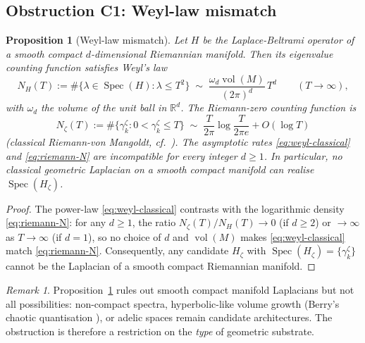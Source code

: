 \documentclass[11pt]{article}
\newtheorem{proposition}[theorem]{Proposition}
\theoremstyle{definition}
\theoremstyle{remark}
\newtheorem{remark}[theorem]{Remark}
\newcommand{\Spec}{\operatorname{Spec}}
\begin{document}
\subsection{Obstruction C1: Weyl-law mismatch}
\label{sec:obs-C1}

\begin{proposition}[Weyl-law mismatch]\label{prop:weyl-obstruction}
Let $H$ be the Laplace-Beltrami operator of a smooth compact
$d$-dimensional Riemannian manifold. Then its eigenvalue counting
function satisfies Weyl's law
\begin{equation}
\label{eq:weyl-classical}
  N_H(T) := \#\{\lambda \in \Spec(H) : \lambda \leq T^2\}
  \;\sim\; \frac{\omega_d \operatorname{vol}(M)}{(2\pi)^d}\,T^d
  \qquad (T \to \infty),
\end{equation}
with $\omega_d$ the volume of the unit ball in $\mathbb{R}^d$. The
Riemann-zero counting function is
\begin{equation}
\label{eq:riemann-N}
  N_\zeta(T) := \#\{\gamma_k^\zeta : 0 < \gamma_k^\zeta \leq T\}
  \;\sim\; \frac{T}{2\pi}\log\!\frac{T}{2\pi e} + O(\log T)
\end{equation}
(classical Riemann-von Mangoldt, cf.\ \cite[\S9.4]{Titchmarsh1986}).
The asymptotic rates \eqref{eq:weyl-classical} and
\eqref{eq:riemann-N} are incompatible for every integer $d \geq 1$.
In particular, no classical geometric Laplacian on a smooth compact
manifold can realise $\Spec(H_\zeta)$.
\end{proposition}

\begin{proof}
The power-law \eqref{eq:weyl-classical} contrasts with the
logarithmic density \eqref{eq:riemann-N}: for any $d \geq 1$, the
ratio $N_\zeta(T) / N_H(T) \to 0$ (if $d \geq 2$) or $\to \infty$ as
$T \to \infty$ (if $d = 1$), so no choice of $d$ and $\operatorname{vol}(M)$
makes \eqref{eq:weyl-classical} match \eqref{eq:riemann-N}.
Consequently, any candidate $H_\zeta$ with
$\Spec(H_\zeta) = \{\gamma_k^\zeta\}$ cannot be the Laplacian of a
smooth compact Riemannian manifold.
\end{proof}

\begin{remark}\label{rem:weyl-workarounds}
Proposition~\ref{prop:weyl-obstruction} rules out smooth compact
manifold Laplacians but not all possibilities: non-compact spectra,
hyperbolic-like volume growth (Berry's chaotic quantisation
\cite{Berry1985, BerryKeating1999}), or adelic spaces
\cite{Connes1999, Connes2026} remain candidate architectures. The
obstruction is therefore a restriction on the \emph{type} of
geometric substrate.
\end{remark}
\end{document}
